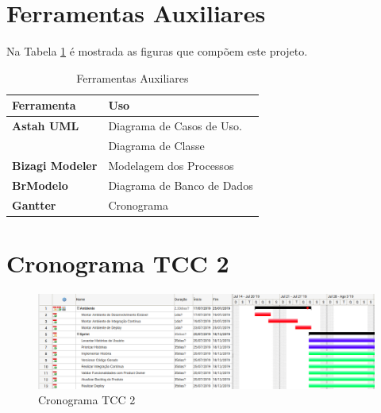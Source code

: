 \section{Ferramentas Auxiliares}

Na Tabela \ref{tab:ferramentas_auxiliares} é mostrada as figuras que compõem este projeto.

\begin{table}[H]
	\begin{tabular}{|p{5.0cm}|p{10.0cm}|} 
	\hline
	\textbf{Ferramenta} & \textbf{Uso} \\ \hline
	\textbf{Astah UML} & Diagrama de Casos de Uso. \\ \hline
	& Diagrama de Classe \\ \hline
	\textbf{Bizagi Modeler} & Modelagem dos Processos \\ \hline
	\textbf{BrModelo} & Diagrama de Banco de Dados \\ \hline
	\textbf{Gantter} & Cronograma \\ \hline
	\end{tabular}
	 \caption{Ferramentas Auxiliares}
	 \label{tab:ferramentas_auxiliares}
\end{table}

\section{Cronograma TCC 2}

\begin{figure}[H]
	\centering
	\includegraphics[width=1.1\textwidth]{figuras/cronograma.png}
	\caption{Cronograma TCC 2}
	\label{img:cronograma}
\end{figure}